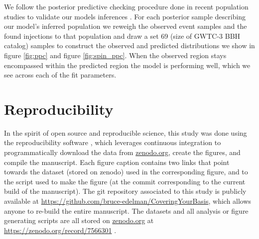 We follow the posterior predictive checking procedure done in recent population studies to validate our models inferences \citep{o3a_pop,Edelman_2022ApJ}. 
For each posterior sample describing our model's inferred population we reweigh the observed event samples and the found injections to that population and draw a set 69 (size of GWTC-3 BBH catalog) samples to construct the observed and predicted distributions we show in figure \ref{fig:ppc} and figure \ref{fig:spin_ppc}. When the observed region stays encompassed within the predicted region the model is performing well, which we see across each of the fit parameters. 

\section{Reproducibility}
\label{sec:reproducibility}

In the spirit of open source and reproducible science, this study was done using the reproducibility software \href{https://github.com/showyourwork/showyourwork}{\showyourwork} \citep{Luger2021}, which leverages continuous integration to programmatically download the data from \href{https://zenodo.org/}{zenodo.org}, create the figures, and compile the manuscript. Each figure caption contains two links that point towards the dataset (stored on zenodo) used in the corresponding figure, and to the script used to make the figure (at the commit corresponding to the current build of the manuscript). The git repository associated to this study is publicly available at \url{https://github.com/bruce-edelman/CoveringYourBasis}, which allows anyone to re-build the entire manuscript. The datasets and all analysis or figure generating scripts are all stored on \href{https://zenodo.org/}{zenodo.org} at \url{https://zenodo.org/record/7566301} \citep{edelman_bruce_2022_7422514}.